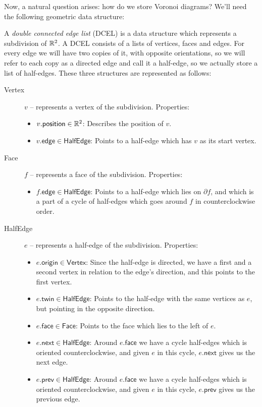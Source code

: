 \newpage
Now, a natural question arises: how do we store Voronoi diagrams? We'll need the following geometric data structure:
\begin{defn}[DCEL]
A \emph{double connected edge list} (DCEL) is a data structure which represents a subdivision of $\mathbb{R}^2$. A DCEL consists of a lists of vertices, faces and edges. For every edge we will have two copies of it, with opposite orientations, so we will refer to each copy as a directed edge and call it a half-edge, so we actually store a list of half-edges. These three structures are represented as follows:
\begin{description}
  \item[\textsf{Vertex}] $v$ -- represents a vertex of the subdivision. Properties:
  \begin{itemize}
    \item $v.\textsf{position} \in \mathbb{R}^2$: Describes the position of $v$.
    \item $v.\textsf{edge} \in \textsf{HalfEdge}$: Points to a half-edge which has $v$ as its start vertex.
  \end{itemize}
  \item[\textsf{Face}] $f$ -- represents a face of the subdivision. Properties:
  \begin{itemize}
    \item $f.\textsf{edge} \in \textsf{HalfEdge}$: Points to a half-edge which lies on $\partial f$, and which is a part of a cycle of half-edges which goes around $f$ in counterclockwise order.
  \end{itemize}
  \item[\textsf{HalfEdge}] $e$ -- represents a half-edge of the subdivision. Properties:
  \begin{itemize}
    \item $e.\textsf{origin} \in \textsf{Vertex}$: Since the half-edge is directed, we have a first and a second vertex in relation to the edge's direction, and this points to the first vertex.
    \item $e.\textsf{twin} \in \textsf{HalfEdge}$: Points to the half-edge with the same vertices as $e$, but pointing in the opposite direction.
    \item $e.\textsf{face} \in \textsf{Face}$: Points to the face which lies to the left of $e$.
    \item $e.\textsf{next} \in \textsf{HalfEdge}$: Around $e.\textsf{face}$ we have a cycle half-edges which is oriented counterclockwise, and given $e$ in this cycle, $e.\textsf{next}$ gives us the next edge.
    \item $e.\textsf{prev} \in \textsf{HalfEdge}$: Around $e.\textsf{face}$ we have a cycle half-edges which is oriented counterclockwise, and given $e$ in this cycle, $e.\textsf{prev}$ gives us the previous edge.
  \end{itemize}
\end{description}
\end{defn}

